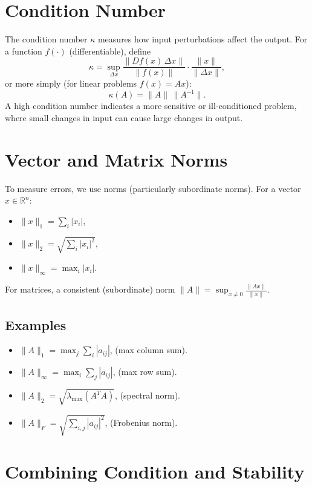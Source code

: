 \section*{Condition Number}

\noindent
The condition number $\kappa$ measures how input perturbations affect the output. For a function $f(\cdot)$ (differentiable), define
\[
\kappa = \sup_{\Delta x} \frac{\|Df(x)\,\Delta x\|}{\|f(x)\|} \cdot \frac{\|x\|}{\|\Delta x\|},
\]
or more simply (for linear problems $f(x)=Ax$):
\[
\kappa(A) = \|A\|\,\|A^{-1}\|.
\]
A high condition number indicates a more sensitive or ill-conditioned problem, where small changes in input can cause large changes in output.

\section*{Vector and Matrix Norms}

To measure errors, we use norms (particularly subordinate norms). For a vector $x\in \mathbb{R}^n$:

\begin{itemize}
    \item $\|x\|_1 = \sum_i |x_i|$,
    \item $\|x\|_2 = \sqrt{\sum_i |x_i|^2}$,
    \item $\|x\|_\infty = \max_i |x_i|$.
\end{itemize}

For matrices, a consistent (subordinate) norm $\|A\| = \sup_{x\neq 0} \frac{\|Ax\|}{\|x\|}.$

\subsection*{Examples}
\begin{itemize}
    \item $\|A\|_1 = \max_{j} \sum_i |a_{ij}|$, (max column sum).
    \item $\|A\|_\infty = \max_{i} \sum_j |a_{ij}|$, (max row sum).
    \item $\|A\|_2 = \sqrt{\lambda_{\max}(A^TA)}$, (spectral norm).
    \item $\|A\|_F = \sqrt{\sum_{i,j} |a_{ij}|^2}$, (Frobenius norm).
\end{itemize}

\section*{Combining Condition and Stability}

